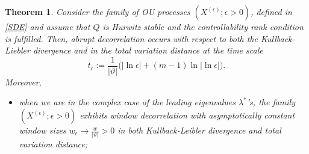 \documentclass[10pt,a4paper]{amsart}
\newtheorem{theorem}{Theorem}
\begin{document}
\begin{theorem}\label{theorem2}  
Consider the family of OU processes $(X^{(\epsilon)}; \epsilon>0)$, defined in \eqref{SDE} and assume that  $Q$ is Hurwitz stable and the controllability rank condition is fulfilled. Then, abrupt decorrelation occurs with respect to both the  Kullback-Liebler divergence and in the total variation distance at the time scale
$$  t_\epsilon:=\frac{1}{|\vartheta|}\Big(|\ln \epsilon|+\left(m-1\right)\ln|\ln \epsilon|\Big).$$  Moreover,
\begin{itemize}
	\item[i)] when we are in the complex case of the leading eigenvalues $\lambda^*$'s, the family $(X^{(\epsilon)}; \epsilon>0)$ exhibits
	window decorrelation with asymptotically constant window sizes $w_\epsilon\to \frac{w}{|\vartheta|}>0$ in both Kullback-Leibler divergence and total variation distance;
	

\end{itemize}
\end{theorem}
\end{document}
